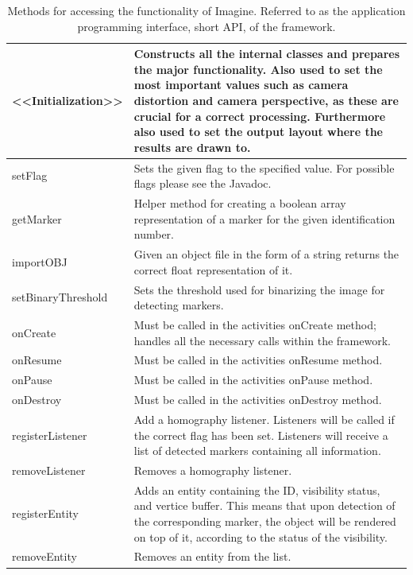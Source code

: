 \begin{table}[H]
	\centering
	{\footnotesize
	\begin{tabulary}{\textwidth}{p{2.5cm} || J}
	<<Initialization>> & Constructs all the internal classes and prepares the major functionality. Also used to set the most important values such as camera distortion and camera perspective, as these are crucial for a correct processing. Furthermore also used to set the output layout where the results are drawn to.\\
	\hline
	setFlag & Sets the given flag to the specified value. For possible flags please see the Javadoc.\\
	\hline
	getMarker & Helper method for creating a boolean array representation of a marker for the given identification number.\\
	\hline
	importOBJ & Given an object file in the form of a string returns the correct float representation of it.\\
	\hline
	setBinaryThreshold & Sets the threshold used for binarizing the image for detecting markers.\\
	\hline
	onCreate & Must be called in the activities onCreate method; handles all the necessary calls within the framework.\\
	\hline
	onResume & Must be called in the activities onResume method.\\
	\hline
	onPause & Must be called in the activities onPause method.\\
	\hline
	onDestroy & Must be called in the activities onDestroy method.\\
	\hline
	registerListener & Add a homography listener. Listeners will be called if the correct flag has been set. Listeners will receive a list of detected markers containing all information.\\
	\hline
	removeListener & Removes a homography listener. \\
	\hline
	registerEntity & Adds an entity containing the ID, visibility status, and vertice buffer. This means that upon detection of the corresponding marker, the object will be rendered on top of it, according to the status of the visibility.\\
	\hline
	removeEntity & Removes an entity from the list.\\
	\end{tabulary}
	}
	\caption[Application Programming Interface]{Methods for accessing the functionality of Imagine. Referred to as the application programming interface, short API, of the framework.}
	\label{api}
\end{table}

